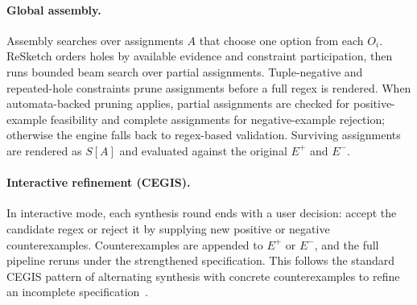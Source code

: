 \documentclass[sigconf,nonacm]{acmart}
\begin{document}
\paragraph{Global assembly.}
Assembly searches over assignments \(A\) that choose one option from each
\(O_i\). ReSketch orders holes by available evidence and constraint
participation, then runs bounded beam search over partial assignments.
Tuple-negative and repeated-hole constraints prune assignments before a full
regex is rendered. When automata-backed pruning applies, partial assignments are
checked for positive-example feasibility and complete assignments for
negative-example rejection; otherwise the engine falls back to regex-based
validation. Surviving assignments are rendered as \(S[A]\) and evaluated
against the original \(E^+\) and \(E^-\).

\paragraph{Interactive refinement (CEGIS).}
In interactive mode, each synthesis round ends with a user decision: accept the
candidate regex or reject it by supplying new positive or negative
counterexamples. Counterexamples are appended to \(E^+\) or \(E^-\), and the
full pipeline reruns under the strengthened specification. This follows the
standard CEGIS pattern of alternating synthesis with concrete counterexamples
to refine an incomplete specification~\cite{jha2017theory}.
\end{document}

